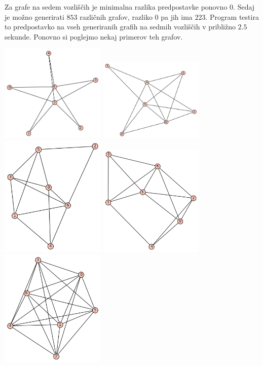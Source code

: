 \documentclass[10pt, a4paper]{article}
\begin{document}
Za grafe na sedem vozliščih je minimalna razlika predpostavke ponovno $0$. Sedaj je možno generirati $853$ različnih grafov, razliko $0$ pa jih ima $223$. Program testira to predpostavko na vseh generiranih grafih na sedmih vozliščih v približno $2.5$ sekunde. Ponovno si poglejmo nekaj primerov teh grafov.

\includegraphics[width=5cm]{min_graf_7.1}
\includegraphics[width=5cm]{min_graf_7.2}
\includegraphics[width=5cm]{min_graf_7.3}
\includegraphics[width=5cm]{min_graf_7.4}
\includegraphics[width=5cm]{min_graf_7.5}
\end{document}
